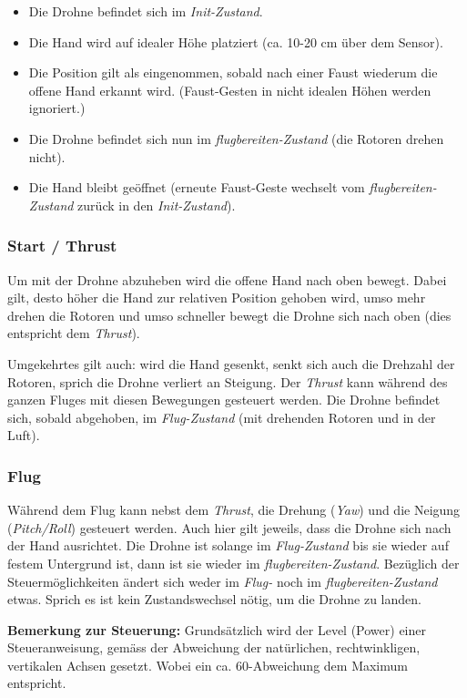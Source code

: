 \begin{itemize}
	\item Die Drohne befindet sich im \textit{Init-Zustand}.
	\item Die Hand wird auf idealer Höhe platziert (ca. 10-20 cm über dem Sensor).
	\item Die Position gilt als eingenommen, sobald nach einer Faust wiederum die offene Hand erkannt wird. (Faust-Gesten in nicht idealen Höhen werden ignoriert.)
	\item Die Drohne befindet sich nun im \textit{flugbereiten-Zustand} (die Rotoren drehen nicht).
	\item Die Hand bleibt geöffnet (erneute Faust-Geste wechselt vom \textit{flugbereiten-Zustand} zurück in den \textit{Init-Zustand}).
\end{itemize}

\subsubsection{Start / Thrust}
Um mit der Drohne abzuheben wird die offene Hand nach oben bewegt. Dabei gilt, desto höher die Hand zur relativen Position gehoben wird, umso mehr drehen die Rotoren und umso schneller bewegt die Drohne sich nach oben (dies entspricht dem \textit{Thrust}).

Umgekehrtes gilt auch: wird die Hand gesenkt, senkt sich auch die Drehzahl der Rotoren, sprich die Drohne verliert an Steigung.
Der \textit{Thrust} kann während des ganzen Fluges mit diesen Bewegungen gesteuert werden.
Die Drohne befindet sich, sobald abgehoben, im \textit{Flug-Zustand} (mit drehenden Rotoren und in der Luft).

\subsubsection{Flug}
Während dem Flug kann nebst dem \textit{Thrust}, die Drehung (\textit{Yaw}) und die Neigung (\textit{Pitch/Roll}) gesteuert werden.
Auch hier gilt jeweils, dass die Drohne sich nach der Hand ausrichtet.
Die Drohne ist solange im \textit{Flug-Zustand} bis sie wieder auf festem Untergrund ist, dann ist sie wieder im \textit{flugbereiten-Zustand}.
Bezüglich der Steuermöglichkeiten ändert sich weder im \textit{Flug-} noch im \textit{flugbereiten-Zustand} etwas.
Sprich es ist kein Zustandswechsel nötig, um die Drohne zu landen.

\textbf{Bemerkung zur Steuerung:} Grundsätzlich wird der Level (Power) einer Steueranweisung, gemäss der Abweichung der natürlichen, rechtwinkligen, vertikalen Achsen gesetzt.
Wobei ein ca. 60\textdegree-Abweichung dem Maximum entspricht.


